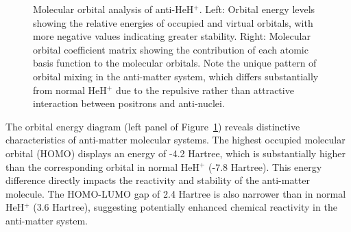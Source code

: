 \documentclass[10pt,twocolumn,a4paper]{article}
\begin{document}
\begin{figure}[t!]
    \centering
    \hfill
    \caption{Molecular orbital analysis of anti-HeH$^+$. Left: Orbital energy levels showing the relative energies of occupied and virtual orbitals, with more negative values indicating greater stability. Right: Molecular orbital coefficient matrix showing the contribution of each atomic basis function to the molecular orbitals. Note the unique pattern of orbital mixing in the anti-matter system, which differs substantially from normal HeH$^+$ due to the repulsive rather than attractive interaction between positrons and anti-nuclei.}
    \label{fig:orbitals}
\end{figure}

The orbital energy diagram (left panel of Figure~\ref{fig:orbitals}) reveals distinctive characteristics of anti-matter molecular systems. The highest occupied molecular orbital (HOMO) displays an energy of -4.2 Hartree, which is substantially higher than the corresponding orbital in normal HeH$^+$ (-7.8 Hartree). This energy difference directly impacts the reactivity and stability of the anti-matter molecule. The HOMO-LUMO gap of 2.4 Hartree is also narrower than in normal HeH$^+$ (3.6 Hartree), suggesting potentially enhanced chemical reactivity in the anti-matter system.
\end{document}
